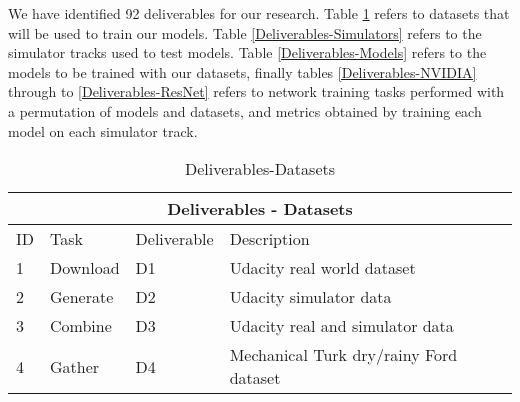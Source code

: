 \documentclass{article}
\begin{document}
We have identified 92 deliverables for our research. Table \ref{Deliverables-Datasets} refers to datasets that will be used to train our models. Table \ref{Deliverables-Simulators} refers to the simulator tracks used to test models. Table \ref{Deliverables-Models} refers to the models to be trained with our datasets, finally tables \ref{Deliverables-NVIDIA} through to \ref{Deliverables-ResNet} refers to network training tasks performed with a permutation of models and datasets, and metrics obtained by training each model on each simulator track.


\begin{table}[]
\begin{center}
\begin{tabular}{|l|l|l|l|}
\hline
\multicolumn{4}{|c|}{Deliverables - Datasets} \\ \hline


ID & Task &  Deliverable & Description \\ \hline\hline
1 & Download & D1 &  Udacity real world dataset  \\ \hline
2 & Generate & D2 &  Udacity simulator data  \\ \hline
3 & Combine & D3 &  Udacity real and simulator data  \\ \hline
4 & Gather & D4 &  Mechanical Turk dry/rainy Ford dataset  \\ \hline

\end{tabular}
\end{center}
\caption{Deliverables-Datasets}
\label{Deliverables-Datasets}
\end{table}

\end{document}
